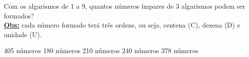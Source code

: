 Com os algarismos de 1 a 9, quantos números ímpares de 3 algarismos  podem ser formados?\\
\underline{\bf Obs:} cada número formado terá três ordens, ou seja, centena (C), dezena (D) e unidade (U).

405 números
180 números
210 números
240 números
378 números



